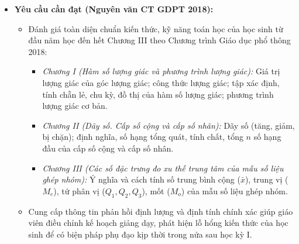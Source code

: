 \documentclass[12pt, a4paper]{article}
\begin{document}
\begin{itemize}[leftmargin=1.2cm]
    \item \textbf{Yêu cầu cần đạt (Nguyên văn CT GDPT 2018):}
    \begin{itemize}[leftmargin=0.6cm]
        \item Đánh giá toàn diện chuẩn kiến thức, kỹ năng toán học của học sinh từ đầu năm học đến hết Chương III theo Chương trình Giáo dục phổ thông 2018:
        \begin{itemize}
            \item \textit{Chương I (Hàm số lượng giác và phương trình lượng giác):} Giá trị lượng giác của góc lượng giác; công thức lượng giác; tập xác định, tính chẵn lẻ, chu kỳ, đồ thị của hàm số lượng giác; phương trình lượng giác cơ bản.
            \item \textit{Chương II (Dãy số. Cấp số cộng và cấp số nhân):} Dãy số (tăng, giảm, bị chặn); định nghĩa, số hạng tổng quát, tính chất, tổng $n$ số hạng đầu của cấp số cộng và cấp số nhân.
            \item \textit{Chương III (Các số đặc trưng đo xu thế trung tâm của mẫu số liệu ghép nhóm):} Ý nghĩa và cách tính số trung bình cộng ($\bar{x}$), trung vị ($M_e$), tứ phân vị ($Q_1, Q_2, Q_3$), mốt ($M_o$) của mẫu số liệu ghép nhóm.
        \end{itemize}
        \item Cung cấp thông tin phản hồi định lượng và định tính chính xác giúp giáo viên điều chỉnh kế hoạch giảng dạy, phát hiện lỗ hổng kiến thức của học sinh để có biện pháp phụ đạo kịp thời trong nửa sau học kỳ I.
    \end{itemize}


\end{itemize}
\end{document}
